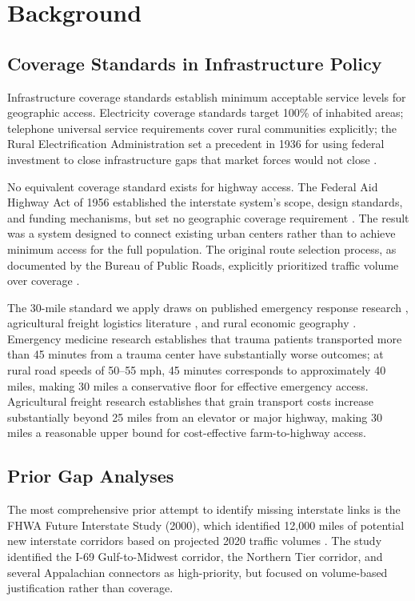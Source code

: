 \section{Background}

\subsection{Coverage Standards in Infrastructure Policy}

Infrastructure coverage standards establish minimum acceptable service levels for geographic access. Electricity coverage standards target 100\% of inhabited areas; telephone universal service requirements cover rural communities explicitly; the Rural Electrification Administration set a precedent in 1936 for using federal investment to close infrastructure gaps that market forces would not close \citep{REA1936}.

No equivalent coverage standard exists for highway access. The Federal Aid Highway Act of 1956 established the interstate system's scope, design standards, and funding mechanisms, but set no geographic coverage requirement \citep{FAHA1956}. The result was a system designed to connect existing urban centers rather than to achieve minimum access for the full population. The original route selection process, as documented by the Bureau of Public Roads, explicitly prioritized traffic volume over coverage \citep{BPR1947}.

The 30-mile standard we apply draws on published emergency response research \citep{Branas2005}, agricultural freight logistics literature \citep{USDA_FR2019}, and rural economic geography \citep{Partridge2008}. Emergency medicine research establishes that trauma patients transported more than 45 minutes from a trauma center have substantially worse outcomes; at rural road speeds of 50--55 mph, 45 minutes corresponds to approximately 40 miles, making 30 miles a conservative floor for effective emergency access. Agricultural freight research establishes that grain transport costs increase substantially beyond 25 miles from an elevator or major highway, making 30 miles a reasonable upper bound for cost-effective farm-to-highway access.

\subsection{Prior Gap Analyses}

The most comprehensive prior attempt to identify missing interstate links is the FHWA Future Interstate Study (2000), which identified 12,000 miles of potential new interstate corridors based on projected 2020 traffic volumes \citep{FHWA_FIS2000}. The study identified the I-69 Gulf-to-Midwest corridor, the Northern Tier corridor, and several Appalachian connectors as high-priority, but focused on volume-based justification rather than coverage.

